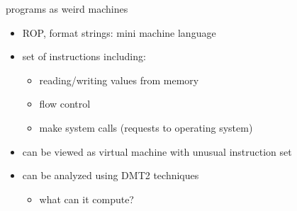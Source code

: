 \begin{frame}{programs as weird machines}
    \begin{itemize}
    \item ROP, format strings: mini machine language
    \item set of instructions including:
        \begin{itemize}
        \item reading/writing values from memory
        \item flow control
        \item make system calls (requests to operating system)
        \end{itemize}
    \item can be viewed as virtual machine with unusual instruction set
    \vspace{.5cm}
    \item can be analyzed using DMT2 techniques
        \begin{itemize}
        \item what can it compute?
        \end{itemize}
    \end{itemize}
\end{frame}

